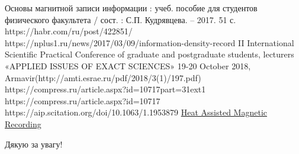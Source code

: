 \documentclass{beamer}
\begin{document}
  \begin{frame}
  \begin{thebibliography}{9}
   Основы магнитной записи информации : учеб. пособие для студентов физического факультета / сост. : С.П. Кудрявцева. – 2017. 51 с.
   https://habr.com/ru/post/422851/
   https://nplus1.ru/news/2017/03/09/information-density-record
   II International Scientific Practical Conference of graduate and postgraduate students,
  lecturers «APPLIED ISSUES OF EXACT SCIENCES»
  19-20 October 2018, Armavir(http://amti.esrae.ru/pdf/2018/3(1)/197.pdf)
   https://compress.ru/article.aspx?id=10717part=31ext1
   https://compress.ru/article.aspx?id=10717
   https://aip.scitation.org/doi/10.1063/1.1953879
   \href{https://www.researchgate.net/publication/224354512_Heat_Assisted_Magnetic_Recording}{Heat Assisted Magnetic Recording}

  \end{thebibliography}
  \end{frame}

\begin{frame}
  \begin{center}
  \noindent{\color{blue} \rule{\linewidth}{0.7mm}}
  \Large{Дякую за увагу!}
  \noindent{\color{blue} \rule{\linewidth}{0.7mm}}
  \end{center}
\end{frame}
\end{document}
